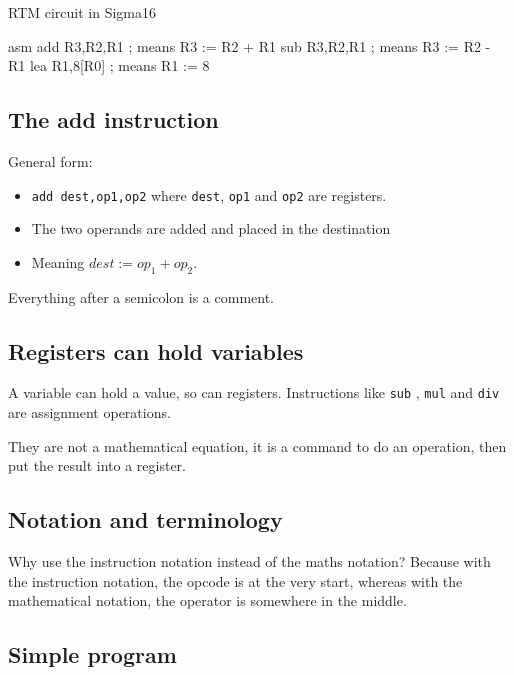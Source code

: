 \begin{highlight}{RTM circuit in Sigma16}
	\begin{code}{asm}
		add R3,R2,R1 ; means R3 := R2 + R1
		sub R3,R2,R1 ; means R3 := R2 - R1
		lea R1,8[R0] ; means R1 := 8
	\end{code}
\end{highlight}

\subsection{The add instruction}\label{sub:the_add_instruction}

General form:
\begin{itemize}
	\item \texttt{add dest,op1,op2} where \texttt{dest}, \texttt{op1} and \texttt{op2} are registers.
	\item The two operands are added and placed in the destination
	\item Meaning \(dest:=op_1+op_2\).
\end{itemize}

Everything after a semicolon is a comment.

\subsection{Registers can hold variables}\label{sub:registers_can_hold_variables}

A variable can hold a value, so can registers.
Instructions like \texttt{sub} , \texttt{mul} and \texttt{div} are assignment operations.

\begin{note}
	They are not a mathematical equation, it is a command to do an operation, then put the result into a register.
\end{note}

\subsection{Notation and terminology}\label{sub:notation_and_terminology}

Why use the instruction notation instead of the maths notation? Because with the instruction notation, the opcode is at the very start, whereas with the mathematical notation, the operator is somewhere in the middle.

\subsection{Simple program}\label{sub:simple_program}

